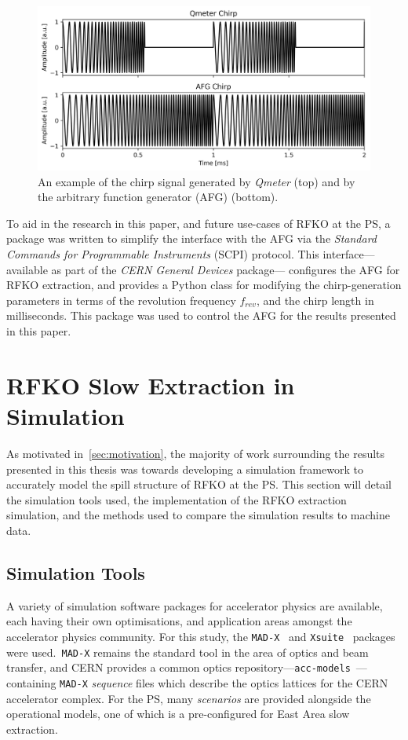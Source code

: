 \documentclass[11pt]{report}
\begin{document}
\begin{figure}
  \centering
  \includegraphics[width=0.6\linewidth]{both-chirps.png}
  \caption{An example of the chirp signal generated by \textit{Qmeter} (top) and by the arbitrary function generator (AFG) (bottom).}\label{eq:both-chirps}
\end{figure}

To aid in the research in this paper, and future use-cases of RFKO at the PS, a package was written to simplify the interface with the AFG via the \textit{Standard Commands for Programmable Instruments} (SCPI) protocol. This interface---available as part of the \textit{CERN General Devices} package--- %
configures the AFG for RFKO extraction, and provides a Python class for modifying the chirp-generation parameters in terms of the revolution frequency $f_{rev}$, and the chirp length in milliseconds. This package was used to control the AFG for the results presented in this paper.


\section{RFKO Slow Extraction in Simulation}

As motivated in~\autoref{sec:motivation}, the majority of work surrounding the results presented in this thesis was towards developing a simulation framework to accurately model the spill structure of RFKO at the PS. This section will detail the simulation tools used, the implementation of the RFKO extraction simulation, and the methods used to compare the simulation results to machine data.

\subsection{Simulation Tools}

A variety of simulation software packages for accelerator physics are available, each having their own optimisations, and application areas amongst the accelerator physics community. For this study, the \verb|MAD-X|~\cite{Iselin:MAD} and \verb|Xsuite|~\cite{xsuite} packages were used.~\verb|MAD-X| remains the standard tool in the area of optics and beam transfer, and CERN provides a common optics repository---\verb|acc-models|~\cite{optics-repo}---containing \verb|MAD-X| \textit{sequence} files which describe the optics lattices for the CERN accelerator complex. For the PS, many \textit{scenarios} are provided alongside the operational models, one of which is a pre-configured for East Area slow extraction.
\end{document}
